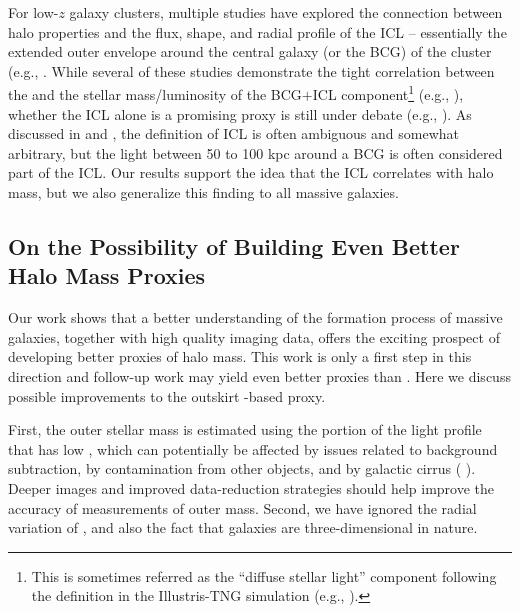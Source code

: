 \documentclass[fleqn,usenatbib,useAMS]{mnras}
\begin{document}
\begin{CJK*}{UTF8}{gbsn}
    For low-$z$ galaxy clusters, multiple studies have explored the connection between halo
    properties and the flux, shape, and radial profile of the ICL --
    essentially the extended outer envelope around the central galaxy (or the BCG) of the cluster
    (e.g., \citealt{Montes2018, Montes2019, Zhang2019b, Furnell2021, Kluge2021, SampaioSantos2021}.
    While several of these studies demonstrate the tight correlation between the \mvir{} and the
    stellar mass/luminosity of the BCG$+$ICL component\footnote{This is sometimes referred as the
    ``diffuse stellar light'' component following the definition in the Illustris-TNG simulation
    (e.g., \citealt{Zhang2019b, SampaioSantos2021}).} (e.g., \citet{Zhang2019b, Kluge2021,
    SampaioSantos2021}), whether the ICL alone is a promising \mvir{} proxy is still under debate
    (e.g., \citealt{Furnell2021}).
    As discussed in \citet{Huang2018b} and \citet{Kluge2020}, the definition of ICL is often 
    ambiguous and somewhat arbitrary, but the light between 50 to 100 kpc around a BCG is often
    considered part of the ICL. 
    Our results support the idea that the ICL correlates with halo mass, but we also generalize this
    finding to all massive galaxies.

    \subsection{On the Possibility of Building Even Better Halo Mass Proxies}
    \label{sec:better_halo_proxy}
    
    Our work shows that a better understanding of the formation process of massive galaxies,
    together with high quality imaging data, offers the exciting prospect of developing better
    proxies of halo mass. 
    This work is only a first step in this direction and follow-up work may yield even better
    proxies than . 
    Here we discuss possible improvements to the outskirt \mstar{}-based \mvir{} proxy.
    
    First, the outer stellar mass is estimated using the portion of the light profile that has low
    \snratio{}, which can potentially be affected by issues related to background subtraction, by
    contamination from other objects, and by galactic cirrus (\eg{} \citealt{Roman2020}). 
    Deeper images and improved data-reduction strategies should help improve the accuracy of
    measurements of outer mass.  
    Second, we have ignored the radial variation of \mlratio{}, and also the fact that galaxies are
    three-dimensional in nature. 
    

\end{CJK*}
\end{document}
